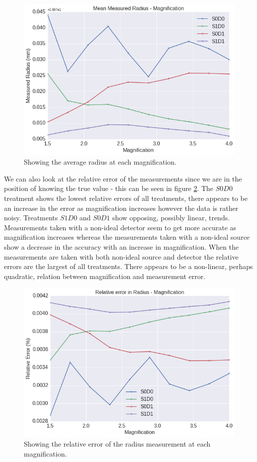 \documentclass[
  twoside,
  11pt, a4paper,
  footinclude=true,
  headinclude=true,
  cleardoublepage=empty
]{scrbook}
\begin{document}
\begin{figure}[h!]
  \centering
    \includegraphics[width=\textwidth]{figures/output_10_0.png}
    \caption{Showing the average radius at each magnification.}
    \label{avgmeasuredradius}
\end{figure}

We can also look at the relative error of the measurements since we are in the position of knowing the true value - this can be seen in figure \ref{relerrormeasuredradius}. The $S0D0$ treatment shows the lowest relative errors of all treatments, there appears to be an increase in the error as magnification increases however the data is rather noisy. Treatments $S1D0$ and $S0D1$ show opposing, possibly linear, trends. Measurements taken with a non-ideal detector seem to get more accurate as magnification increases whereas the measurements taken with a non-ideal source show a decrease in the accuracy with an increase in magnification. When the measurements are taken with both non-ideal source and detector the relative errors are the largest of all treatments. There appears to be a non-linear, perhaps quadratic, relation between magnification and measurement error.

\begin{figure}[h!]
  \centering
    \includegraphics[width=\textwidth]{figures/output_8_0.png}
    \caption{Showing the relative error of the radius measurement at each magnification.}
        \label{relerrormeasuredradius}
\end{figure}
\end{document}
